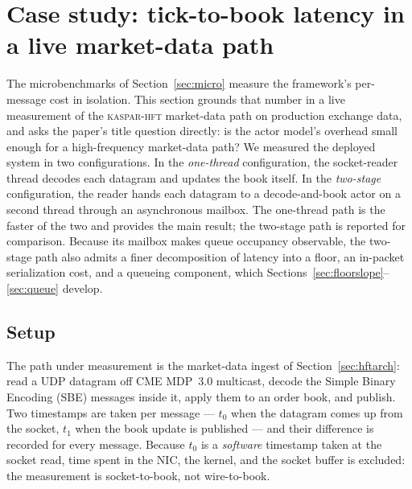 \documentclass[11pt]{article}
\begin{document}
\FloatBarrier

\section{Case study: tick-to-book latency in a live market-data path}
\label{sec:casestudy}

The microbenchmarks of Section~\ref{sec:micro} measure the framework's
per-message cost in isolation. This
section grounds that number in a live measurement of the \textsc{kaspar-hft}
market-data path on production exchange data, and asks the paper's title question
directly: is the actor model's overhead small enough for a high-frequency
market-data path? We measured the deployed system in two configurations. In the
\emph{one-thread} configuration, the socket-reader thread decodes each datagram
and updates the book itself. In the \emph{two-stage} configuration, the reader
hands each datagram to a decode-and-book actor on a second thread through an
asynchronous mailbox. The one-thread path is the faster of the two and provides
the main result; the two-stage path is reported for comparison. Because its
mailbox makes queue occupancy observable, the two-stage path also admits a finer
decomposition of latency into a floor, an in-packet serialization cost, and a
queueing component, which Sections~\ref{sec:floorslope}--\ref{sec:queue}
develop.

\subsection{Setup}

The path under measurement is the market-data ingest of Section~\ref{sec:hftarch}:
read a UDP datagram off CME MDP~3.0 multicast, decode the Simple Binary Encoding
(SBE) messages \cite{fixsbe} inside it, apply them to an order book, and publish.
Two timestamps are taken per message --- $t_0$ when the datagram comes up from the
socket, $t_1$ when the book update is published --- and their difference is
recorded for every message. Because $t_0$ is a \emph{software} timestamp taken at
the socket read, time spent in the NIC, the kernel, and the socket buffer is
excluded: the measurement is socket-to-book, not wire-to-book.
\end{document}
